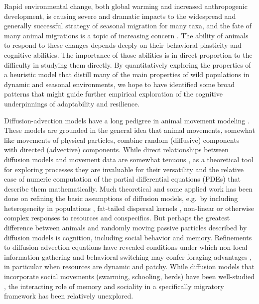 \documentclass[utf8]{frontiersSCNS} %
\begin{document}
	Rapid environmental change, both global warming and increased anthropogenic development, is causing severe and dramatic impacts to the widespread and generally successful strategy of seasonal migration for many taxa, and the fate of many animal migrations is a topic of increasing concern \citep{Kauffman2021, Wilcove2008}. The ability of animals to respond to these changes depends deeply on their behavioral plasticity and cognitive abilities. The importance of those abilities is in direct proportion to the difficulty in studying them directly. By quantitatively exploring the properties of a heuristic model that distill many of the main properties of wild populations in dynamic and seasonal environments, we hope to have identified some broad patterns that might guide further empirical exploration of the cognitive underpinnings of adaptability and resilience.
	
	
	
	
	Diffusion-advection models have a long pedigree in animal movement modeling \citep{Skellam1951, Turchin1998, Okubo2001}. These models are grounded in the general idea that animal movements, somewhat like movements of physical particles, combine random (diffusive) components with directed (advective) components. While direct relationships between diffusion models and movement data are somewhat tenuous \citep{Gurarie2011,Potts2020}, as a theoretical tool for exploring processes they are invaluable for their versatility and the relative ease of numeric computation of the partial differential equations (PDEs) that describe them mathematically. Much theoretical and some applied work has been done on refining the basic assumptions of diffusion models, e.g.~by including heterogeneity in populations \citep{Skalski2003, Gurarie2009}, fat-tailed dispersal kernels \citep{Kot1996}, non-linear or otherwise complex responses to resources and conspecifics. But perhaps the greatest difference between animals and randomly moving passive particles described by diffusion models is cognition, including social behavior and memory. Refinements to diffusion-advection equations have revealed conditions under which non-local information gathering \citep{Fagan2017} and behavioral switching may confer foraging advantages \citep{Fagan2019}, in particular when resources are dynamic and patchy. While diffusion models that incorporate social movements (swarming, schooling, herds) have been well-studied \citep{Okubo1986,Gruenbaum1994,Mogilner1999}, the interacting role of memory and sociality in a specifically migratory framework has been relatively unexplored. 
	
\end{document}
